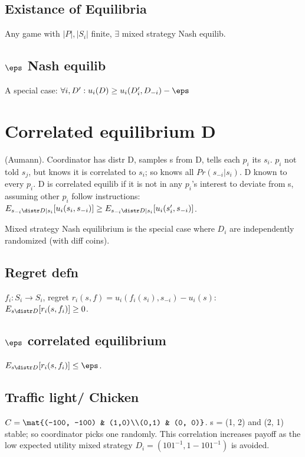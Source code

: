 \documentclass[10pt]{amsart}
\begin{document}
\subsection{Existance of Equilibria}
Any game with $|P|, |S_{i}|$ finite, $\exists$ mixed strategy Nash equilib. \why

\subsection{$\eps$ Nash equilib}
A special case: $\forall i, D': u_{i}(D) \geq u_{i}(D'_{i}, D_{-i}) - \eps$

\section{Correlated equilibrium D}
(Aumann). Coordinator has distr D, samples s from D, tells each $p_{i}$ its $s_{i}$. $p_{i}$ not told $s_{j}$, but knows it is correlated to $s_{i}$; so knows all $Pr(s_{-i}|s_{i})$. D known to every $p_{i}$. D is correlated equilib if it is not in any $p_{i}$'s interest to deviate from s, assuming other $p_{i}$ follow instructions: \\
$E_{s_{-i} \distr D|s_{i}} [u_{i}(s_{i}, s_{-i})] \geq E_{s_{-i}\distr D|s_{i}} [u_{i}(s'_{i}, s_{-i})] $.

Mixed strategy Nash equilibrium is the special case where $D_{i}$ are independently randomized (with diff coins).

\subsection{Regret defn}
$f_{i}:S_{i} \to S_{i}$, regret $r_{i}(s,f) = u_{i}(f_{i}(s_{i}), s_{-i}) - u_{i}(s)$:\\
 $E_{s \distr D}[r_{i}(s,f_{i})] \geq 0$.

\subsection{$\eps$ correlated equilibrium}
$E_{s \distr D}[r_{i}(s,f_{i})] \leq \eps$.

\subsection{Traffic light/ Chicken} $C = \mat{(-100, -100) & (1,0)\\(0,1) & (0, 0)}$. s = (1, 2) and (2, 1) stable; so coordinator picks one randomly. This correlation increases payoff as the low expected utility mixed strategy $D_{i} = (101^{-1}, 1-101^{-1})$ is avoided.
\end{document}
